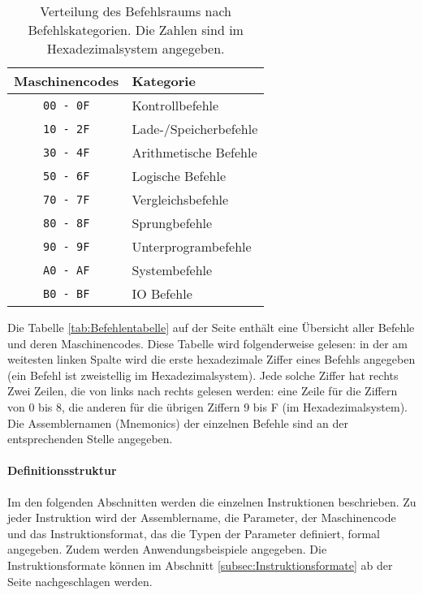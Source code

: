 \begin{table}
  \centering
  \begin{tabular}{|c|l|}                        \hline
    Maschinencodes   & Kategorie              \\\hline\hline
    \texttt{00 - 0F} & Kontrollbefehle        \\
    \texttt{10 - 2F} & Lade-/Speicherbefehle  \\
    \texttt{30 - 4F} & Arithmetische Befehle  \\
    \texttt{50 - 6F} & Logische Befehle       \\
    \texttt{70 - 7F} & Vergleichsbefehle      \\
    \texttt{80 - 8F} & Sprungbefehle          \\
    \texttt{90 - 9F} & Unterprogrambefehle    \\
    \texttt{A0 - AF} & Systembefehle          \\
    \texttt{B0 - BF} & IO Befehle             \\\hline
  \end{tabular}
  \caption[Verteilung des Befehlsraums]
          {Verteilung des Befehlsraums nach Befehlskategorien.
          Die Zahlen sind im Hexadezimalsystem angegeben.}
  \label{tab:Befehlraumverteilung}
\end{table}


Die Tabelle \ref{tab:Befehlentabelle} auf der Seite 
\pageref{tab:Befehlentabelle} enthält eine Übersicht aller Befehle und
deren Maschinencodes.
Diese Tabelle wird folgenderweise gelesen:
in der am weitesten linken Spalte wird die erste hexadezimale Ziffer eines
Befehls angegeben (ein Befehl ist zweistellig im Hexadezimalsystem).
Jede solche Ziffer hat rechts Zwei Zeilen, die von links nach rechts gelesen
werden: eine Zeile für die Ziffern von 0 bis 8, die anderen für die übrigen
Ziffern 9 bis F (im Hexadezimalsystem). Die Assemblernamen (Mnemonics) der
einzelnen Befehle sind an der entsprechenden Stelle angegeben.

\paragraph{Definitionsstruktur}
Im den folgenden Abschnitten werden die einzelnen Instruktionen beschrieben. Zu
jeder Instruktion wird der \gls{Assemblername}, die Parameter, der Maschinencode
und das Instruktionsformat, das die Typen der Parameter definiert, formal
angegeben. Zudem werden Anwendungsbeispiele angegeben. Die Instruktionsformate
können im Abschnitt \ref{subsec:Instruktionsformate} ab der Seite
\pageref{subsec:Instruktionsformate} nachgeschlagen werden.

